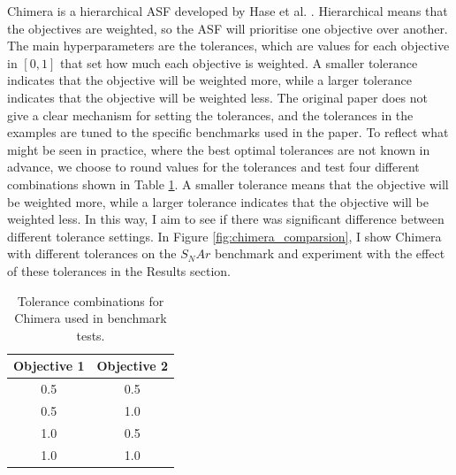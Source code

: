 Chimera is a hierarchical ASF developed by Hase et al. \cite{Hase2018b, Hase2020a}. Hierarchical means that the objectives are weighted, so the ASF will prioritise one objective over another. The main hyperparameters are the tolerances, which are values for each objective in $[0,1]$ that set how much each objective is weighted. A smaller tolerance indicates that the objective will be weighted more, while a larger tolerance indicates that the objective will be weighted less. The original paper does not give a clear mechanism for setting the tolerances, and the tolerances in the examples are tuned to the specific benchmarks used in the paper. To reflect what might be seen in practice, where the best optimal tolerances are not known in advance, we choose to round values for the tolerances and test four different combinations shown in Table \ref{tab:chimera_tolerances}. A smaller tolerance means that the objective will be weighted more, while a larger tolerance indicates that the objective will be weighted less. In this way, I aim to see if there was significant difference between different tolerance settings. In Figure \ref{fig:chimera_comparsion}, I show Chimera with different tolerances on the $S_NAr$ benchmark and experiment with the effect of these tolerances in the Results section.


\begin{table}
    \centering
    \caption{Tolerance combinations for Chimera used in benchmark tests.}
    \begin{tabular}{cc}
         Objective 1 & Objective 2  \\
         \hline
         0.5 & 0.5 \\
         0.5 & 1.0 \\
         1.0 & 0.5 \\
         1.0 & 1.0 \\
    \end{tabular}
    \label{tab:chimera_tolerances}
\end{table}

